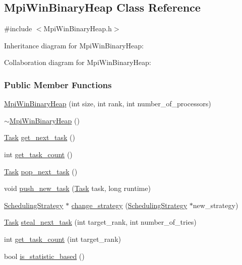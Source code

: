 \hypertarget{a00028}{}\subsection{Mpi\+Win\+Binary\+Heap Class Reference}
\label{a00028}


{\ttfamily \#include $<$Mpi\+Win\+Binary\+Heap.\+h$>$}



Inheritance diagram for Mpi\+Win\+Binary\+Heap\+:


Collaboration diagram for Mpi\+Win\+Binary\+Heap\+:
\subsubsection*{Public Member Functions}
\begin{DoxyCompactItemize}
\item 
\hyperlink{a00028_a4a5fd6d6bbb17dae222b879232d11374}{Mpi\+Win\+Binary\+Heap} (int size, int rank, int number\+\_\+of\+\_\+processors)
\item 
\hyperlink{a00028_a907d0f48eee11b2563569fc51b6b3b6c}{$\sim$\+Mpi\+Win\+Binary\+Heap} ()
\item 
\hyperlink{a00002}{Task} \hyperlink{a00028_a380cd524e7944a34b62e1f24e9e177dc}{get\+\_\+next\+\_\+task} ()
\item 
int \hyperlink{a00028_a5b1e74e642f812a39a5aa6a780767361}{get\+\_\+task\+\_\+count} ()
\item 
\hyperlink{a00002}{Task} \hyperlink{a00028_a7320931203f8f33f3bc22bd7d91106f7}{pop\+\_\+next\+\_\+task} ()
\item 
void \hyperlink{a00028_a96148127c5d44c8b884a90c204ee8368}{push\+\_\+new\+\_\+task} (\hyperlink{a00002}{Task} task, long runtime)
\item 
\hyperlink{a00033}{Scheduling\+Strategy} $\ast$ \hyperlink{a00028_aff536070d82c0a220436a1c19e07b584}{change\+\_\+strategy} (\hyperlink{a00033}{Scheduling\+Strategy} $\ast$new\+\_\+strategy)
\item 
\hyperlink{a00002}{Task} \hyperlink{a00028_a713a9f45479e2b80a880867bbb003b8d}{steal\+\_\+next\+\_\+task} (int target\+\_\+rank, int number\+\_\+of\+\_\+tries)
\item 
int \hyperlink{a00028_a870ed56e326e732655a4ba14fa47a4cd}{get\+\_\+task\+\_\+count} (int target\+\_\+rank)
\item 
bool \hyperlink{a00028_a72e6b555d122e42f1dd72ea72f626975}{is\+\_\+statistic\+\_\+based} ()
\end{DoxyCompactItemize}
